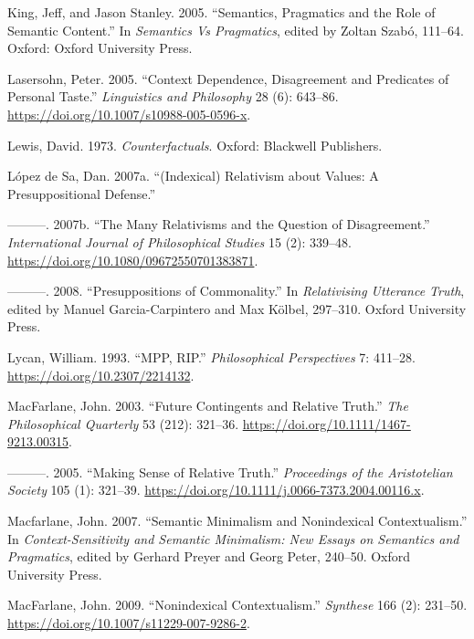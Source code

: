 \documentclass[
  11pt,
  letterpaper,
  DIV=11,
  numbers=noendperiod,
  oneside]{scrartcl}
\newlength{\cslhangindent}
\newenvironment{CSLReferences}[2] %
 {\begin{list}{}{%
  \setlength{\itemindent}{0pt}
  \setlength{\leftmargin}{0pt}
  \setlength{\parsep}{0pt}
  \ifodd #1
   \setlength{\leftmargin}{\cslhangindent}
   \setlength{\itemindent}{-1\cslhangindent}
  \fi
  \setlength{\itemsep}{#2\baselineskip}}}
 {\end{list}}
\begin{document}
\begin{CSLReferences}{1}{0}
King, Jeff, and Jason Stanley. 2005. {``Semantics, Pragmatics and the
Role of Semantic Content.''} In \emph{Semantics Vs Pragmatics}, edited
by Zoltan Szabó, 111--64. Oxford: Oxford University Press.

Lasersohn, Peter. 2005. {``Context Dependence, Disagreement and
Predicates of Personal Taste.''} \emph{Linguistics and Philosophy} 28
(6): 643--86. \url{https://doi.org/10.1007/s10988-005-0596-x}.

Lewis, David. 1973. \emph{Counterfactuals}. Oxford: Blackwell
Publishers.

López de Sa, Dan. 2007a. {``(Indexical) Relativism about Values: A
Presuppositional Defense.''}

---------. 2007b. {``The Many Relativisms and the Question of
Disagreement.''} \emph{International Journal of Philosophical Studies}
15 (2): 339--48. \url{https://doi.org/10.1080/09672550701383871}.

---------. 2008. {``Presuppositions of Commonality.''} In
\emph{Relativising Utterance Truth}, edited by Manuel Garcia-Carpintero
and Max Kölbel, 297--310. Oxford University Press.

Lycan, William. 1993. {``MPP, RIP.''} \emph{Philosophical Perspectives}
7: 411--28. \url{https://doi.org/10.2307/2214132}.

MacFarlane, John. 2003. {``{Future Contingents and Relative Truth}.''}
\emph{The Philosophical Quarterly} 53 (212): 321--36.
\url{https://doi.org/10.1111/1467-9213.00315}.

---------. 2005. {``{Making Sense of Relative Truth}.''}
\emph{Proceedings of the Aristotelian Society} 105 (1): 321--39.
\url{https://doi.org/10.1111/j.0066-7373.2004.00116.x}.

Macfarlane, John. 2007. {``Semantic Minimalism and Nonindexical
Contextualism.''} In \emph{Context-Sensitivity and Semantic Minimalism:
New Essays on Semantics and Pragmatics}, edited by Gerhard Preyer and
Georg Peter, 240--50. Oxford University Press.

MacFarlane, John. 2009. {``{Nonindexical Contextualism}.''}
\emph{Synthese} 166 (2): 231--50.
\url{https://doi.org/10.1007/s11229-007-9286-2}.


\end{CSLReferences}
\end{document}
